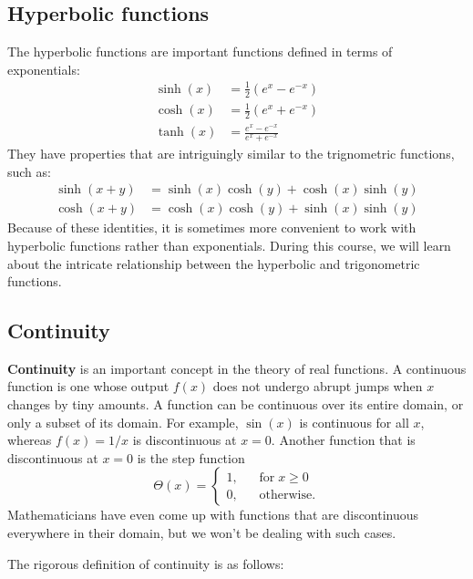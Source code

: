 \documentclass[10pt,a4paper]{article}
\begin{document}
\subsection{Hyperbolic functions}\label{hyperbolic-functions}

The hyperbolic functions are important functions defined in terms of
exponentials:
\begin{align}
  \sinh(x) &= \frac{1}{2}\left(e^{x} - e^{-x}\right) \\
  \cosh(x) &= \frac{1}{2}\left(e^{x} + e^{-x}\right) \\
  \tanh(x) &= \frac{e^{x} - e^{-x}}{e^{x} + e^{-x}}
\end{align}
They have properties that are intriguingly similar to the trignometric
functions, such as:
\begin{align}
  \sinh(x+y) &= \sinh(x)\cosh(y) + \cosh(x)\sinh(y) \\
  \cosh(x+y) &= \cosh(x)\cosh(y) + \sinh(x)\sinh(y)
\end{align}
Because of these identities, it is sometimes more convenient to work
with hyperbolic functions rather than exponentials. During this course,
we will learn about the intricate relationship between the hyperbolic
and trigonometric functions.

\subsection{Continuity}

\textbf{Continuity} is an important concept in the theory of real
functions. A continuous function is one whose output $f(x)$ does not
undergo abrupt jumps when $x$ changes by tiny amounts. A function can
be continuous over its entire domain, or only a subset of its domain.
For example, $\sin(x)$ is continuous for all $x$, whereas
$f(x) = 1/x$ is discontinuous at $x = 0$. Another function that is
discontinuous at $x=0$ is the step function
\begin{equation}
  \Theta(x) = \left\{\begin{array}{ll} 1, &\;\;\;\textrm{for} \; x \ge 0\\ 0,&\;\;\; \textrm{otherwise.}\end{array}\right.
\end{equation}
Mathematicians have even come up with functions that are discontinuous
everywhere in their domain, but we won't be dealing with such cases.

The rigorous definition of continuity is as follows:
\end{document}

